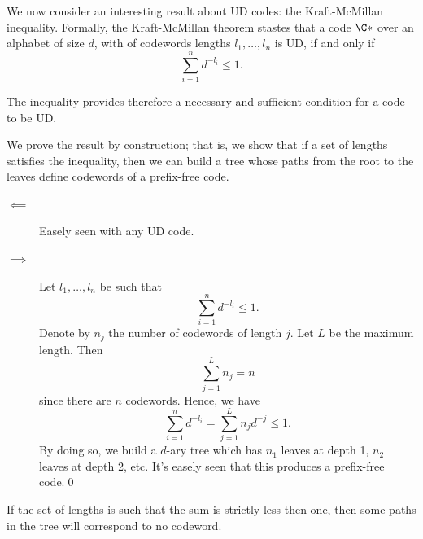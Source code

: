 \documentclass{subfiles}
\begin{document}
    We now consider an interesting result about UD codes: the Kraft-McMillan inequality.
        Formally, the Kraft-McMillan theorem stastes that a code \(\C*\) over an alphabet 
        of size \(d\), with of codewords lengths \(l_{1}, \ldots, l_{n}\) is UD, if and only if 
        \[
            \sum_{i = 1}^{n}d^{-l_{i}} \le 1.
        \]

    The inequality provides therefore a necessary and sufficient condition for a
        code to be UD. 

    \begin{proof*}
        We prove the result by construction; that is, 
            we show that if a set of lengths satisfies the inequality,
            then we can build a tree whose paths from the root to the leaves 
            define codewords of a prefix-free code.

        \begin{description}
            \item [\(\impliedby\)] Easely seen with any UD code.
            \item [\(\implies\)] Let \(l_{1}, \ldots, l_{n}\) be such that 
                \[
                    \sum_{i = 1}^{n} d^{-l_{i}} \le 1.
                \]
                Denote by \(n_{j}\) the number of codewords of length \(j\).
                Let \(L\) be the maximum length.
                Then 
                \[
                    \sum_{j = 1}^{L} n_{j} = n
                \]
                since there are \(n\) codewords. Hence, we have 
                \[
                    \sum_{i = 1}^{n} d^{-l_{i}} = \sum_{j = 1}^{L} n_{j}d^{-j} \le 1.
                \]
                By doing so, we build a \(d\)-ary tree which has \(n_{1}\) 
                leaves at depth 1, \(n_{2}\) leaves at depth 2, etc.
                It's easely seen that this produces a prefix-free code.\qed
        \end{description}
    \end{proof*}
        
    \begin{remark*}
        If the set of lengths is such that the sum is strictly less then one,
            then some paths in the tree will correspond to no codeword.
    \end{remark*}
\end{document}
